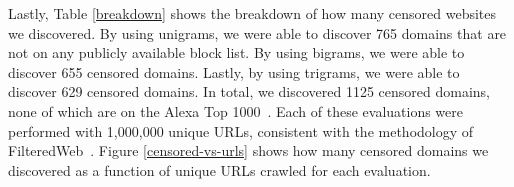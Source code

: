 \begin{table}[b]
  \begin{center}
  \end{center}
  \caption{\label{effective-unigrams}Sample of unigrams with
    significant blockrates}
\end{table}

Lastly, Table \ref{breakdown} shows the breakdown of how many censored
websites we discovered. By using unigrams, we were able to discover
765 domains that are not on any publicly available block list. By
using bigrams, we were able to discover 655 censored domains. Lastly,
by using trigrams, we were able to discover 629 censored domains. In
total, we discovered 1125 censored domains, none of which are on the
Alexa Top 1000~\cite{alexa:top1000}. Each of these evaluations were
performed with 1,000,000 unique URLs, consistent with the methodology
of FilteredWeb~\cite{darer2017filteredweb}. Figure
\ref{censored-vs-urls} shows how many censored domains we discovered
as a function of unique URLs crawled for each evaluation.

